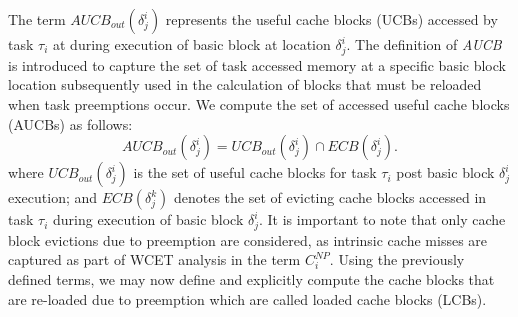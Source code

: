 \noindent The term \begin{math}\textit{AUCB}_{out}(\delta_{j}^{i})\end{math} represents the useful cache blocks (UCBs) accessed by task \begin{math}\tau_{i}\end{math} at during execution of basic block at location \begin{math}\delta_{j}^{i}\end{math}. The definition of \textit{AUCB} is introduced to capture the set of task accessed memory at a specific basic block location subsequently used in the calculation of blocks that must be reloaded when task preemptions occur.  We compute the set of accessed useful cache blocks (AUCBs) as follows:
\begin{equation}\label{eqn:aucb-formula}
    \textit{AUCB}_{out}(\delta_{j}^{i}) = \textit{UCB}_{out}(\delta_{j}^{i}) \cap \textit{ECB}(\delta_{j}^{i}).
\end{equation}
\noindent where \begin{math}\textit{UCB}_{out}(\delta_{j}^{i})\end{math} is the set of useful cache blocks for task \begin{math}\tau_{i}\end{math} post basic block \begin{math}\delta_{j}^{i}\end{math} execution; and \begin{math}\textit{ECB}(\delta_{j}^{k})\end{math} denotes the set of evicting cache blocks accessed in task \begin{math}\tau_{i}\end{math} during execution of basic block \begin{math}\delta_{j}^{i}\end{math}. It is important to note that only cache block evictions due to preemption are considered, as intrinsic cache misses are captured as part of WCET analysis in the term \begin{math}C_{i}^{NP}\end{math}.  Using the previously defined terms, we may now define and explicitly compute the cache blocks that are re-loaded due to preemption which are called loaded cache blocks (LCBs).

